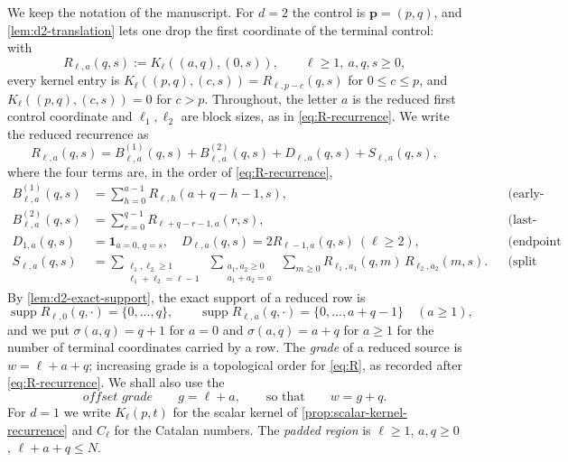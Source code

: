 \documentclass[11pt,reqno]{amsart}
\theoremstyle{definition}
\theoremstyle{remark}
\newcommand{\supp}{\operatorname{supp}}
\newcommand{\one}{\mathbf 1}
\begin{document}
We keep the notation of the manuscript.  For $d=2$ the control is
$\mathbf p=(p,q)$, and \cref{lem:d2-translation} lets one drop the first
coordinate of the terminal control: with
\[
 R_{\ell,a}(q,s):=K_\ell((a,q),(0,s)),\qquad \ell\geq1,\ a,q,s\geq0,
\]
every kernel entry is $K_\ell((p,q),(c,s))=R_{\ell,p-c}(q,s)$ for
$0\leq c\leq p$, and $K_\ell((p,q),(c,s))=0$ for $c>p$.  Throughout, the
letter $a$ is the reduced first control coordinate and $\ell_1,\ell_2$ are
block sizes, as in \eqref{eq:R-recurrence}.  We write the reduced
recurrence as
\begin{equation}\label{eq:R}
 R_{\ell,a}(q,s)=
 B^{(1)}_{\ell,a}(q,s)+B^{(2)}_{\ell,a}(q,s)+D_{\ell,a}(q,s)
 +S_{\ell,a}(q,s),
\end{equation}
where the four terms are, in the order of \eqref{eq:R-recurrence},
\begin{align}
 B^{(1)}_{\ell,a}(q,s)&=\sum_{h=0}^{a-1}R_{\ell,h}(a+q-h-1,s),
 &&\text{(early-band sum)}\label{eq:B1}\\
 B^{(2)}_{\ell,a}(q,s)&=\sum_{r=0}^{q-1}R_{\ell+q-r-1,a}(r,s),
 &&\text{(last-band sum)}\label{eq:B2}\\
 D_{1,a}(q,s)&=\one_{a=0,\,q=s},\quad
 D_{\ell,a}(q,s)=2R_{\ell-1,a}(q,s)\ (\ell\geq2),
 &&\text{(endpoint term)}\label{eq:Dred}\\
 S_{\ell,a}(q,s)&=\sum_{\substack{\ell_1,\ell_2\geq1\\ \ell_1+\ell_2=\ell-1}}
   \ \sum_{\substack{a_1,a_2\geq0\\ a_1+a_2=a}}\ \sum_{m\geq0}
   R_{\ell_1,a_1}(q,m)\,R_{\ell_2,a_2}(m,s).
 &&\text{(split term)}\label{eq:S}
\end{align}
By \cref{lem:d2-exact-support}, the exact support of a reduced row is
\begin{equation}\label{eq:redsupport}
 \supp R_{\ell,0}(q,\cdot)=\{0,\ldots,q\},\qquad
 \supp R_{\ell,a}(q,\cdot)=\{0,\ldots,a+q-1\}\quad(a\geq1),
\end{equation}
and we put $\sigma(a,q)=q+1$ for $a=0$ and $\sigma(a,q)=a+q$ for $a\geq1$
for the number of terminal coordinates carried by a row.  The
\emph{grade} of a reduced source is $w=\ell+a+q$; increasing grade is a
topological order for \eqref{eq:R}, as recorded after
\eqref{eq:R-recurrence}.  We shall also use the
\begin{equation}\label{eq:offset}
 \textit{offset grade}\qquad g=\ell+a,\qquad\text{so that}\qquad w=g+q .
\end{equation}
For $d=1$ we write $K_\ell(p,t)$ for the scalar kernel of
\cref{prop:scalar-kernel-recurrence} and $C_\ell$ for the Catalan numbers.
The \emph{padded region} is $\ell\geq1$, $a,q\geq0$, $\ell+a+q\leq N$.
\end{document}

